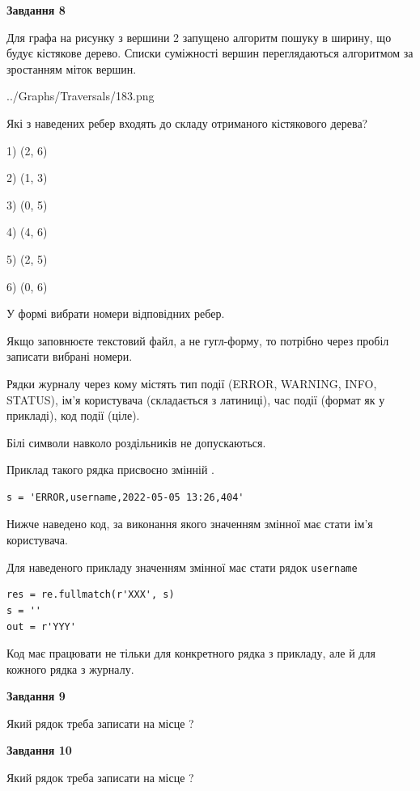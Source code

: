 \documentclass[12pt, ukrainian]{article}
\def\code#1{\Verb!#1!}
\begin{document}
{\begin {large}
{\begin {center}\textbf{Завдання 8}\end {center}}\par
Для графа на рисунку з вершини 2 запущено алгоритм пошуку в ширину, що будує кістякове дерево. Списки суміжності вершин переглядаються алгоритмом за зростанням міток вершин.\par
\begin{center}
	{../Graphs/Traversals/183.png}
\end{center}
\par Які з наведених ребер входять до складу отриманого кістякового дерева?\par
1) (2, 6)\par
2) (1, 3)\par
3) (0, 5)\par
4) (4, 6)\par
5) (2, 5)\par
6) (0, 6)\par
{\vskip 15pt} У формі вибрати номери відповідних ребер.


Якщо заповнюєте текстовий файл, а не гугл-форму, то потрібно через пробіл записа\-ти вибрані номери.\par
\newpage


Рядки журналу через кому містять тип події (ERROR, WARNING, INFO, STATUS), ім'я користувача (складається з латиниці), час події (фор\-мат як у прикладі), код події (ціле).

Білі символи навколо роздільників не допускаються.

Приклад такого рядка присвоєно змінній .



\begin{verbatim}
s = 'ERROR,username,2022-05-05 13:26,404'
\end{verbatim}


Нижче наведено код, за виконання якого значенням змінної  має стати ім'я користувача.

Для наведеного прикладу значенням змінної  має стати рядок \code{username}



\begin{verbatim}
res = re.fullmatch(r'XXX', s)
s = ''
out = r'YYY'
\end{verbatim}


Код має працювати не тільки для конкретного рядка з прикладу, але й для кожного рядка з журналу.

{\begin {center}\textbf{Завдання 9}\end {center}}\par
Який рядок треба записати на місце  ?\par
\vspace{5mm}


{\begin {center}\textbf{Завдання 10}\end {center}}\par
Який рядок треба записати на місце  ?\par


\newpage


\end {large}}
\end{document}
